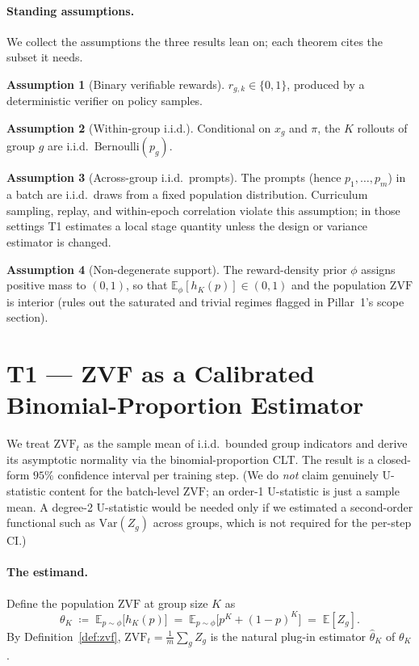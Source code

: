 \documentclass[11pt]{article}
\theoremstyle{plain}
\theoremstyle{definition}
\newtheorem{assumption}{Assumption}
\theoremstyle{remark}
\newcommand{\ZVF}{\ensuremath{\mathrm{ZVF}}}
\newcommand{\Var}{\ensuremath{\mathrm{Var}}}
\newcommand{\E}{\mathbb{E}}
\newcommand{\1}{\mathbb{1}}
\newcommand{\Bern}{\mathrm{Bernoulli}}
\begin{document}
\paragraph{Standing assumptions.} We collect the assumptions the three results
lean on; each theorem cites the subset it needs.
\begin{assumption}[Binary verifiable rewards]\label{ass:binary}
$r_{g,k}\in\{0,1\}$, produced by a deterministic verifier on policy samples.
\end{assumption}
\begin{assumption}[Within-group i.i.d.]\label{ass:within-iid}
Conditional on $x_g$ and $\pi$, the $K$ rollouts of group $g$ are i.i.d.\
$\Bern(p_g)$.
\end{assumption}
\begin{assumption}[Across-group i.i.d.\ prompts]\label{ass:across-iid}
The prompts (hence $p_1,\dots,p_m$) in a batch are i.i.d.\ draws from a fixed
population distribution. Curriculum sampling, replay, and within-epoch
correlation violate this assumption; in those settings T1 estimates a local
stage quantity unless the design or variance estimator is changed.
\end{assumption}
\begin{assumption}[Non-degenerate support]\label{ass:nondegen}
The reward-density prior $\phi$ assigns positive mass to $(0,1)$, so that
$\E_\phi[h_K(p)] \in (0,1)$ and the population \ZVF{} is interior (rules out
the saturated and trivial regimes flagged in Pillar~1's scope section).
\end{assumption}

\section{T1 --- ZVF as a Calibrated Binomial-Proportion Estimator}\label{sec:T1}
We treat $\ZVF_t$ as the sample mean of i.i.d.\ bounded group indicators and
derive its asymptotic normality via the binomial-proportion CLT. The result is
a closed-form $95\%$ confidence interval per training step. (We do \emph{not}
claim genuinely U-statistic content for the batch-level \ZVF{}; an order-1
U-statistic is just a sample mean. A degree-2 U-statistic would be needed only
if we estimated a second-order functional such as $\Var(Z_g)$ across groups,
which is not required for the per-step CI.)

\paragraph{The estimand.} Define the population \ZVF{} at group size $K$ as
\begin{equation}\label{eq:theta}
\theta_K \;\coloneqq\; \E_{p\sim\phi}\big[h_K(p)\big]
\;=\; \E_{p\sim\phi}\big[p^{K}+(1-p)^{K}\big] \;=\; \E[Z_g].
\end{equation}
By Definition~\ref{def:zvf}, $\ZVF_t = \frac1m\sum_{g} Z_g$ is the natural
plug-in estimator $\widehat\theta_K$ of $\theta_K$.
\end{document}

